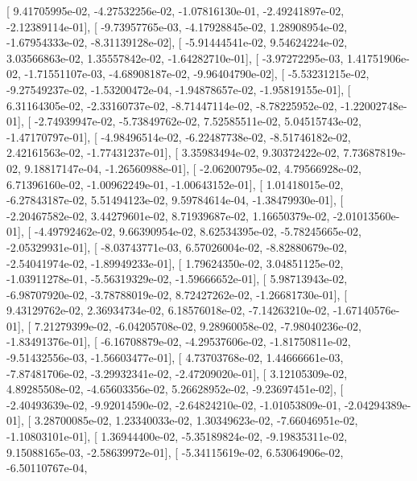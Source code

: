 \documentclass{article}
\begin{document}
       [  9.41705995e-02,  -4.27532256e-02,  -1.07816130e-01,
         -2.49241897e-02,  -2.12389114e-01],
       [ -9.73957765e-03,  -4.17928845e-02,   1.28908954e-02,
         -1.67954333e-02,  -8.31139128e-02],
       [ -5.91444541e-02,   9.54624224e-02,   3.03566863e-02,
          1.35557842e-02,  -1.64282710e-01],
       [ -3.97272295e-03,   1.41751906e-02,  -1.71551107e-03,
         -4.68908187e-02,  -9.96404790e-02],
       [ -5.53231215e-02,  -9.27549237e-02,  -1.53200472e-04,
         -1.94878657e-02,  -1.95819155e-01],
       [  6.31164305e-02,  -2.33160737e-02,  -8.71447114e-02,
         -8.78225952e-02,  -1.22002748e-01],
       [ -2.74939947e-02,  -5.73849762e-02,   7.52585511e-02,
          5.04515743e-02,  -1.47170797e-01],
       [ -4.98496514e-02,  -6.22487738e-02,  -8.51746182e-02,
          2.42161563e-02,  -1.77431237e-01],
       [  3.35983494e-02,   9.30372422e-02,   7.73687819e-02,
          9.18817147e-04,  -1.26560988e-01],
       [ -2.06200795e-02,   4.79566928e-02,   6.71396160e-02,
         -1.00962249e-01,  -1.00643152e-01],
       [  1.01418015e-02,  -6.27843187e-02,   5.51494123e-02,
          9.59784614e-04,  -1.38479930e-01],
       [ -2.20467582e-02,   3.44279601e-02,   8.71939687e-02,
          1.16650379e-02,  -2.01013560e-01],
       [ -4.49792462e-02,   9.66390954e-02,   8.62534395e-02,
         -5.78245665e-02,  -2.05329931e-01],
       [ -8.03743771e-03,   6.57026004e-02,  -8.82880679e-02,
         -2.54041974e-02,  -1.89949233e-01],
       [  1.79624350e-02,   3.04851125e-02,  -1.03911278e-01,
         -5.56319329e-02,  -1.59666652e-01],
       [  5.98713943e-02,  -6.98707920e-02,  -3.78788019e-02,
          8.72427262e-02,  -1.26681730e-01],
       [  9.43129762e-02,   2.36934734e-02,   6.18576018e-02,
         -7.14263210e-02,  -1.67140576e-01],
       [  7.21279399e-02,  -6.04205708e-02,   9.28960058e-02,
         -7.98040236e-02,  -1.83491376e-01],
       [ -6.16708879e-02,  -4.29537606e-02,  -1.81750811e-02,
         -9.51432556e-03,  -1.56603477e-01],
       [  4.73703768e-02,   1.44666661e-03,  -7.87481706e-02,
         -3.29932341e-02,  -2.47209020e-01],
       [  3.12105309e-02,   4.89285508e-02,  -4.65603356e-02,
          5.26628952e-02,  -9.23697451e-02],
       [ -2.40493639e-02,  -9.92014590e-02,  -2.64824210e-02,
         -1.01053809e-01,  -2.04294389e-01],
       [  3.28700085e-02,   1.23340033e-02,   1.30349623e-02,
         -7.66046951e-02,  -1.10803101e-01],
       [  1.36944400e-02,  -5.35189824e-02,  -9.19835311e-02,
          9.15088165e-03,  -2.58639972e-01],
       [ -5.34115619e-02,   6.53064906e-02,  -6.50110767e-04,
\end{document}
